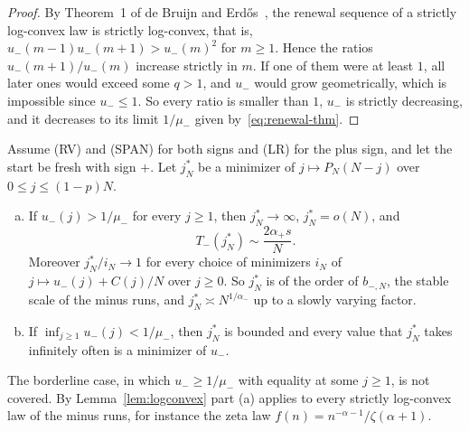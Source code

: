 \begin{proof}
By Theorem~1 of de Bruijn and Erd\H{o}s~\cite{debruijnerdos1953}, the
renewal sequence of a strictly log-convex law is strictly log-convex, that
is, $u_\minus(m-1)u_\minus(m+1)>u_\minus(m)^2$ for $m\ge1$. Hence the ratios
$u_\minus(m+1)/u_\minus(m)$ increase strictly in $m$. If one of them were at
least $1$, all later ones would exceed some $q>1$, and $u_\minus$ would grow
geometrically, which is impossible since $u_\minus\le1$. So every ratio is
smaller than $1$, $u_\minus$ is strictly decreasing, and it decreases to its
limit $1/\mu_\minus$ given by~\eqref{eq:renewal-thm}.
\end{proof}

\begin{introtheorem}\label{thm:antimode}
Assume (RV) and (SPAN) for both signs and (LR) for the plus sign, and let the
start be fresh with sign $\plus$. Let $j^*_N$ be a minimizer of
$j\mapsto P_N(N-j)$ over $0\le j\le(1-p)N$.
\begin{enumerate}[(a)]
\item If $u_\minus(j)>1/\mu_\minus$ for every $j\ge1$, then $j^*_N\to\infty$,
$j^*_N=o(N)$, and
\[
 T_\minus(j^*_N)\sim\frac{2\alpha_\plus s}{N} .
\]
Moreover $j^*_N/i_N\to1$ for every choice of minimizers $i_N$ of
$j\mapsto u_\minus(j)+C(j)/N$ over $j\ge0$. So $j^*_N$ is of the order of
$b_{\minus,N}$, the stable scale of the minus runs, and
$j^*_N\asymp N^{1/\alpha_\minus}$ up to a slowly varying factor.
\item If $\inf_{j\ge1}u_\minus(j)<1/\mu_\minus$, then $j^*_N$ is bounded and
every value that $j^*_N$ takes infinitely often is a minimizer of $u_\minus$.
\end{enumerate}
\end{introtheorem}

The borderline case, in which $u_\minus\ge1/\mu_\minus$ with equality at some
$j\ge1$, is not covered. By Lemma~\ref{lem:logconvex} part (a) applies to every
strictly log-convex law of the minus runs, for instance the zeta law
$f(n)=n^{-\alpha-1}/\zeta(\alpha+1)$.

